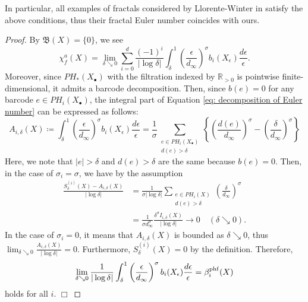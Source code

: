 \documentclass[12pt]{amsart}
\numberwithin{equation}{section}
\def\qed{\hfill $\Box$}
\def\qed{\hfill $\Box$}
\begin{document}
In particular, all examples of fractals considered by Llorente-Winter in \cite{LW07} satisfy the above conditions, thus their fractal Euler number coincides with ours. 

\begin{proof}
    By $\mathfrak{B} (X) = \{0\}$, we see
    \begin{equation}
        \chi_{f}^{a} (X)=\lim_{\delta \searrow 0} \sum_{i=0}^{d} \frac{(-1)^i}{|\log \delta|} \int_\delta^1 \left(\frac{\epsilon}{d_\infty}\right)^\sigma b_i(X_\epsilon) \frac{d\epsilon}{\epsilon}. 
        \label{eq: decomposition of Euler number}
    \end{equation}
    Moreover, since $PH_\ast (X_\bullet)$ with the filtration indexed by $\mathbb{R}_{>0}$ is pointwise finite-dimensional, it admits a barcode decomposition.
    Then, since $b(e) = 0$ for any barcode $e \in PH_i (X_\bullet)$, the integral part of Equation \ref{eq: decomposition of Euler number} can be expressed as follows: 
    \begin{equation*}
        A_{i,\delta} (X) \coloneqq
        \int_\delta^1 \left(\frac{\epsilon}{d_\infty}\right)^\sigma b_i(X_\epsilon) \frac{d\epsilon}{\epsilon}
        = \frac{1}{\sigma} \sum_{\substack{e\in PH_i (X_\bullet)\\ d(e) > \delta}} \left\{ \left( \frac{d(e)}{d_\infty} \right)^{\sigma} - \left( \frac{\delta}{d_\infty} \right)^{\sigma}\right\}
    \end{equation*}
    Here, we note that $|e|>\delta$ and $d(e) >\delta$ are the same because $b(e) = 0$. 
    Then, in the case of $\sigma_i =\sigma$, we have by the assumption
    \begin{align*}
        \frac{S_\delta^{(i)} (X) - A_{i,\delta}(X)}{|\log \delta|} 
        &= \frac{1}{\sigma|\log\delta|} \sum_{\substack{e\in PH_i (X)\\ d(e) > \delta}} \left( \frac{\delta}{d_\infty} \right)^{\sigma}\\
        &= \frac{1}{\sigma d_\infty^\sigma}\frac{\delta^\sigma I_{i,\delta} (X)}{|\log\delta|} \rightarrow 0 \quad (\delta \searrow 0).
    \end{align*}
    In the case of $\sigma_i = 0$, 
    it means that $A_{i,\delta} (X)$ is bounded as $\delta \searrow 0$, thus $\displaystyle \lim_{\delta \searrow 0} \frac{A_{i,\delta} (X)}{|\log \delta|} = 0$.
    Furthermore, $S_\delta^{(i)} (X) = 0$ by the definition. 
    Therefore, 
    \begin{equation*}
        \lim_{\delta \searrow 0}\frac{1}{|\log \delta|} \int_\delta^1 \left(\frac{\epsilon}{d_\infty}\right)^\sigma b_i(X_\epsilon) \frac{d\epsilon}{\epsilon}
        = \beta_i ^{\rm phf} (X)
    \end{equation*}
    holds for all $i$.
    \qed
\end{proof}
\end{document}

